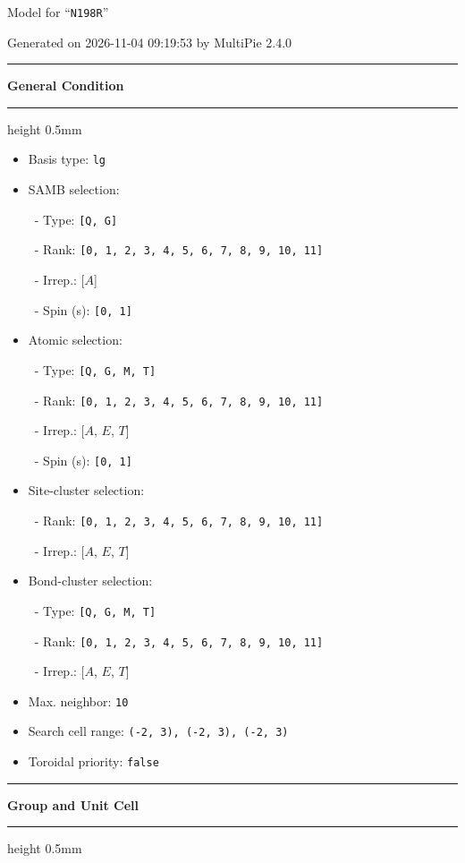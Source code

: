 \documentclass[fleqn,10pt,landscape]{jsarticle}
\begin{document}
\setcounter{MaxMatrixCols}{32}

\renewcommand{\tablename}{Table~}
\renewcommand{\figurename}{Figure~}
\setlength{\baselineskip}{16pt}
\setlength{\parindent}{0pt}
\setlength{\mathindent}{0pt}
\footnotesize
\begin{center}
\LARGE
Model for ``\texttt{N198R}''
\end{center}
\begin{flushright}
Generated on 2026-11-04 09:19:53 by MultiPie 2.4.0
\end{flushright}
\setlength{\baselineskip}{16pt}
\footnotesize
\vspace{5mm}
\noindent \rule[0.5mm]{5mm}{0.5mm}\hspace{3mm}\textbf{General Condition}\hspace{3mm}\leaders\hrule height 0.5mm\hfill\kern0pt
\vspace{3mm}

\begin{itemize}
\item Basis type: \texttt{lg}

\item SAMB selection:

\, - Type: \texttt{[Q, G]}

\, - Rank: \texttt{[0, 1, 2, 3, 4, 5, 6, 7, 8, 9, 10, 11]}

\, - Irrep.: [$A$]

\, - Spin (s): \texttt{[0, 1]}

\item Atomic selection:

\, - Type: \texttt{[Q, G, M, T]}

\, - Rank: \texttt{[0, 1, 2, 3, 4, 5, 6, 7, 8, 9, 10, 11]}

\, - Irrep.: [$A$, $E$, $T$]

\, - Spin (s): \texttt{[0, 1]}

\item Site-cluster selection:

\, - Rank: \texttt{[0, 1, 2, 3, 4, 5, 6, 7, 8, 9, 10, 11]}

\, - Irrep.: [$A$, $E$, $T$]

\item Bond-cluster selection:

\, - Type: \texttt{[Q, G, M, T]}

\, - Rank: \texttt{[0, 1, 2, 3, 4, 5, 6, 7, 8, 9, 10, 11]}

\, - Irrep.: [$A$, $E$, $T$]

\item Max. neighbor: \texttt{10}

\item Search cell range: \texttt{(-2, 3), (-2, 3), (-2, 3)}

\item Toroidal priority: \texttt{false}

\end{itemize}
\vspace{5mm}
\noindent \rule[0.5mm]{5mm}{0.5mm}\hspace{3mm}\textbf{Group and Unit Cell}\hspace{3mm}\leaders\hrule height 0.5mm\hfill\kern0pt
\vspace{3mm}
\end{document}
